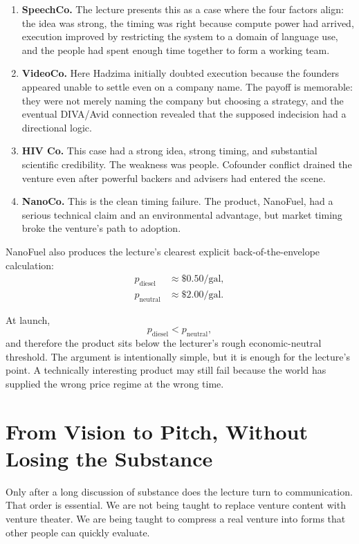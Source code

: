 \begin{enumerate}
  \item \textbf{SpeechCo.} The lecture presents this as a case where the four factors align: the idea was strong, the timing was right because compute power had arrived, execution improved by restricting the system to a domain of language use, and the people had spent enough time together to form a working team.
  \item \textbf{VideoCo.} Here Hadzima initially doubted execution because the founders appeared unable to settle even on a company name. The payoff is memorable: they were not merely naming the company but choosing a strategy, and the eventual DIVA/Avid connection revealed that the supposed indecision had a directional logic.
  \item \textbf{HIV Co.} This case had a strong idea, strong timing, and substantial scientific credibility. The weakness was people. Cofounder conflict drained the venture even after powerful backers and advisers had entered the scene.
  \item \textbf{NanoCo.} This is the clean timing failure. The product, NanoFuel, had a serious technical claim and an environmental advantage, but market timing broke the venture's path to adoption.
\end{enumerate}

NanoFuel also produces the lecture's clearest explicit back-of-the-envelope calculation:
\begin{align}
p_{\text{diesel}} &\approx \$0.50/\text{gal}, \\
p_{\text{neutral}} &\approx \$2.00/\text{gal}.
\end{align}

At launch,
\begin{equation}
p_{\text{diesel}} < p_{\text{neutral}},
\end{equation}
and therefore the product sits below the lecturer's rough economic-neutral threshold. The argument is intentionally simple, but it is enough for the lecture's point. A technically interesting product may still fail because the world has supplied the wrong price regime at the wrong time.

\section{From Vision to Pitch, Without Losing the Substance}

Only after a long discussion of substance does the lecture turn to communication. That order is essential. We are not being taught to replace venture content with venture theater. We are being taught to compress a real venture into forms that other people can quickly evaluate.

